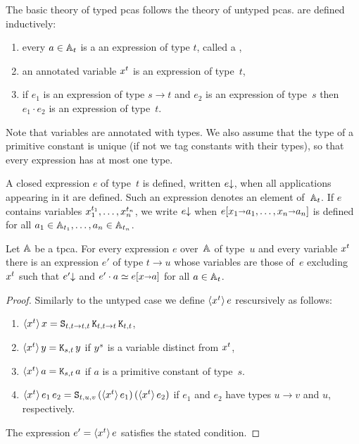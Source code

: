 The basic theory of typed pcas follows the theory of untyped pcas.
 are defined inductively:
%
\begin{enumerate}
\item every $a \in \AA_t$ is a an expression of type $t$, called a
  ,
\item an annotated variable $\annot{x}{t}$ is an expression of type~$t$,
\item if $e_1$ is an expression of type $s \to t$ and $e_2$ is an
  expression of type~$s$ then $e_1 \cdot e_2$ is an expression of
  type~$t$.
\end{enumerate}
%
Note that variables are annotated with types. We also
assume that the type of a primitive constant is unique (if not we tag
constants with their types), so that every expression has at most one type.

A closed expression $e$ of type~$t$ is defined, written $\defined{e}$,
when all applications appearing in it are defined. Such an expression
denotes an element of~$\AA_t$. If $e$ contains variables
$\annot{x_1}{t_1}, \ldots, \annot{x_n}{t_n}$, we write $\defined{e}$
when $\subst{e}{x_1 \subto a_1, \ldots, x_n \subto a_n}$ is defined
for all $a_1 \in \AA_{t_1}, \ldots, a_n \in \AA_{t_n}$.

\begin{theorem}
  Let $\AA$ be a tpca. For every expression $e$ over~$\AA$ of type~$u$ and
  every variable $\annot{x}{t}$ there is an expression $e'$ of type $t
  \to u$ whose variables are those of~$e$ excluding~$\annot{x}{t}$
  such that $\defined{e'}$ and $e' \cdot a \kleq \subst{e}{x \subto
    a}$ for all $a \in \AA_t$.
\end{theorem}

\begin{proof}
  Similarly to the untyped case we define $\tpcalam{x}{t} e$ rescursively as follows:
  \begin{enumerate}
  \item $\tpcalam{x}{t} x = \combS_{t,t \to t,t} \, \combK_{t,t \to
      t} \, \combK_{t,t}$,
  \item $\tpcalam{x}{t} y = \combK_{s,t}\, y$ if $\annot{y}{s}$ is a
    variable distinct from $\annot{x}{t}$,
  \item $\tpcalam{x}{t} a = \combK_{s,t} \, a$ if $a$ is a primitive
    constant of type~$s$.
  \item $\tpcalam{x}{t} {e_1\, e_2} = \combS_{t,u,v}\,
    (\tpcalam{x}{t} e_1) \, (\tpcalam{x}{t} e_2)$ if $e_1$ and
    $e_2$ have types $u \to v$ and $u$, respectively.
  \end{enumerate}
  The expression $e' = \tpcalam{x}{t} e$ satisfies the stated condition.
\end{proof}

